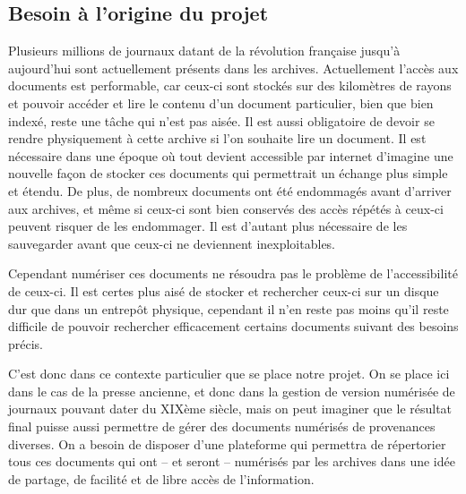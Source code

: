     \subsection{Besoin à l'origine du projet}
    \label{subsec:besoin}
    Plusieurs millions de journaux datant de la révolution française jusqu’à aujourd’hui sont
    actuellement présents dans les archives. Actuellement l’accès aux documents est performable,
    car ceux-ci sont stockés sur des kilomètres de rayons et pouvoir accéder et lire le contenu
    d’un document particulier, bien que bien indexé, reste une tâche qui n’est pas aisée.
    Il est aussi obligatoire de devoir se rendre physiquement à cette archive si l’on souhaite lire un document.
    Il est nécessaire dans une époque où tout devient accessible par internet d’imagine une nouvelle
    façon de stocker ces documents qui permettrait un échange plus simple et étendu. De plus,
    de nombreux documents ont été endommagés avant d’arriver aux archives, et même si ceux-ci
    sont bien conservés des accès répétés à ceux-ci peuvent risquer de les endommager. Il est d’autant
    plus nécessaire de les sauvegarder avant que ceux-ci ne deviennent inexploitables.

    Cependant numériser ces documents ne résoudra pas le problème de l’accessibilité de ceux-ci.
    Il est certes plus aisé de stocker et rechercher ceux-ci sur un disque dur que dans un entrepôt physique,
    cependant il n’en reste pas moins qu’il reste difficile de pouvoir rechercher efficacement certains documents suivant des besoins précis.

    C’est donc dans ce contexte particulier que se place notre projet. On se place ici dans
    le cas de la presse ancienne, et donc dans la gestion de version numérisée de journaux pouvant
    dater du XIXème siècle, mais on peut imaginer que le résultat final puisse aussi permettre de gérer
    des documents numérisés de provenances diverses. On a besoin de disposer d’une plateforme qui permettra
    de répertorier tous ces documents qui ont – et seront – numérisés par les archives dans une idée de partage,
    de facilité et de libre accès de l’information.

